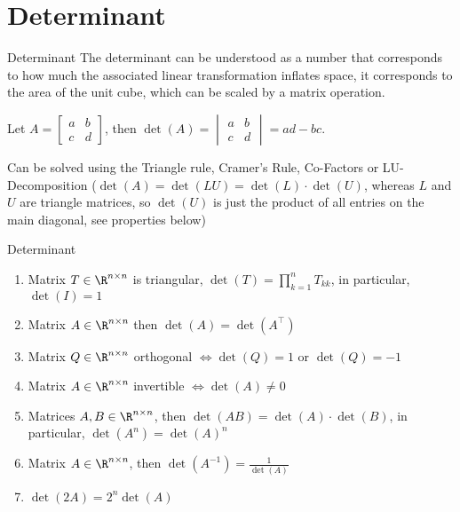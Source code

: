 \newsection
\section{Determinant}
\label{sec:determinants}
\setcounter{numberingConfig}{4}
\begin{definition}[]{Determinant}
    The determinant can be understood as a number that corresponds to how much the associated linear transformation inflates space, it corresponds to the area of the unit cube, which can be scaled by a matrix operation.
\end{definition}
\setcounter{numberingConfig}{3}

 Let $A = \begin{bmatrix}a & b\\c & d\end{bmatrix}$, then $\det(A) = \begin{vmatrix}a & b\\c & d\end{vmatrix} = ad - bc$.

 Can be solved using the Triangle rule, Cramer's Rule, Co-Factors or LU-Decomposition ($\det(A) = \det(LU) = \det(L) \cdot \det(U)$, whereas $L$ and $U$ are triangle matrices, so $\det(U)$ is just the product of all entries on the main diagonal, see properties below)

\setcounter{all}{8}
\begin{properties}[]{Determinant}
    \begin{enumerate}[label=(\Roman*)]
        \item \shortproposition Matrix $T \in \R^{n \times n}$ is triangular, $\det(T) = \prod_{k = 1}^{n}T_{kk}$, in particular, $\det(I) = 1$
        \item \shorttheorem Matrix $A \in \R^{n \times n}$ then $\det(A) = \det(A^{\top})$
        \item \shortproposition Matrix $Q \in \R^{n \times n}$ orthogonal $\Leftrightarrow \det(Q) = 1$ or $\det(Q) = -1$
        \item \shortproposition Matrix $A \in \R^{n \times n}$ invertible $\Leftrightarrow \det(A) \neq 0$
        \item \shortproposition Matrices $A, B \in \R^{n \times n}$, then $\det(AB) = \det(A)\cdot \det(B)$, in particular, $\det(A^n) = \det(A)^n$
        \item \shortproposition Matrix $A \in \R^{n \times n}$, then $\det(A^{-1}) = \displaystyle\frac{1}{\det(A)}$
        \item $\det(2A) = 2^n \det(A)$
    \end{enumerate}
\end{properties}

